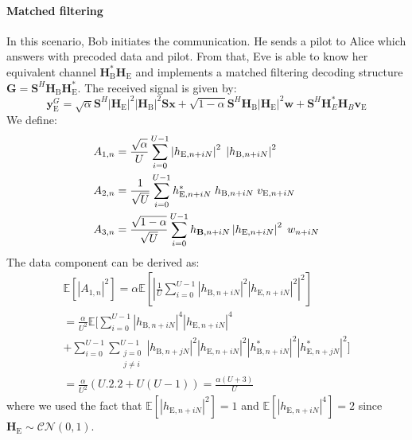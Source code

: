 \documentclass[journal,comsoc]{IEEEtran}
\newcommand{\module}[1]{\left|#1\right|}
\newcommand{\EX}[1]{\mathbb{E} \left[#1\right]}%
\newcommand{\HE}{\textbf{H}_{\text{E}}}
\newcommand{\HB}{\textbf{H}_{\text{B}}}
\newcommand{\ve}{\textbf{v}_{\text{E}}}
\newcommand{\spread}{\textbf{S}}
\newcommand{\w}{\textbf{w}}
\begin{document}
\paragraph{Matched filtering}
In this scenario, Bob initiates the communication. He sends a pilot to Alice which answers with precoded data and pilot. From that, Eve is able to know her equivalent channel $\HB^*\HE$ and implements a matched filtering decoding structure $\textbf{G} = \spread^H \HB\HE^*$. The received signal is given by:
\begin{equation}
\textbf{y}_{\text{E}}^G = \sqrt{\alpha} \spread^H \module{\HE}^2 \module{\HB}^2 \spread\textbf{x} +  \sqrt{1-\alpha} \spread^H \HB\module{\HE}^2 \w  +  \spread^H  \textbf{H}^*_E \textbf{H}_B \ve
\label{eq:rx_eve_filt1}
\end{equation}
We define: 
\begin{equation}
\begin{split}
A_{1,n} &= \frac{\sqrt{\alpha}}{U}\sum_{i=0}^{U-1}  \left|h_{\text{E}, n + iN}\right|^2 \; \left|h_{\text{B}, n + iN}\right|^2 \\
A_{2,n} &= \frac{1}{\sqrt{U}}\sum_{i=0}^{U-1} h^*_{\text{E}, n + iN} \; h_{\text{B}, n + iN} \; v_{\text{E}, n + iN}\\
A_{3,n} &=\frac{ \sqrt{1-\alpha}  }{\sqrt{U}}\sum_{i=0}^{U-1}    h_{\text{\textbf{B}}, n + iN} \left|h_{\text{E}, n + iN}\right|^2\; w_{n + iN}
\end{split}
\end{equation}
The data component can be derived as:
\begin{multline}
\EX{|A_{1,n}|^2} = \alpha \EX{\left|\frac{1}{U}\sum_{i=0}^{U-1} \left| h_{\text{B}, n + iN}\right|^2 \left| h_{\text{E}, n + iN}\right|^2\right|^2} \\
=\frac{\alpha}{U^2} \mathbb{E} \Bigg[\sum_{i=0}^{U-1} \left| h_{\text{B}, n + iN}\right|^4 \left| h_{\text{E}, n + iN}\right|^4 \\
+ \sum_{i=0}^{U-1}\sum_{\substack{j=0 \\ j\neq i}}^{U-1}  \left| h_{\text{B}, n + jN}\right|^2 \left| h_{\text{E}, n + iN}\right|^2 \left| h^*_{\text{B}, n + iN}\right|^2 \left| h^*_{\text{E}, n + jN}\right|^2 \Bigg] \\
= \frac{\alpha}{U^2} \left(U.2.2 + U(U-1) \right) = \frac{\alpha (U+3)}{U}
\label{eq:data_eve_filt1}
\end{multline}
where we used the fact that $\EX{\left| h_{\text{E}, n + iN}\right|^2} = 1$ and $\EX{\left| h_{\text{E}, n + iN}\right|^4} = 2$ since $\HE \sim \mathcal{CN}(0,1)$.\\
\end{document}
